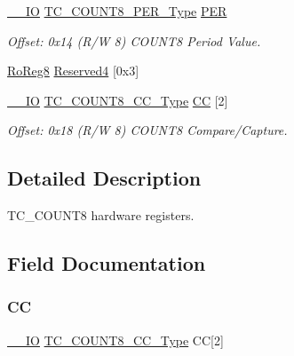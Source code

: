 \begin{DoxyCompactItemize}
\item 
\mbox{\hyperlink{core__cm0plus_8h_aec43007d9998a0a0e01faede4133d6be}{\+\_\+\+\_\+\+IO}} \mbox{\hyperlink{union_t_c___c_o_u_n_t8___p_e_r___type}{T\+C\+\_\+\+C\+O\+U\+N\+T8\+\_\+\+P\+E\+R\+\_\+\+Type}} \mbox{\hyperlink{struct_tc_count8_ae94ea0925cc8635e20b7da2f6b7da943}{P\+ER}}
\begin{DoxyCompactList}\small\item\em Offset\+: 0x14 (R/W 8) C\+O\+U\+N\+T8 Period Value. \end{DoxyCompactList}\item 
\mbox{\hyperlink{group___s_a_m_d21_e15_a__definitions_ga0d957f1433aaf5d70e4dc2b68288442d}{Ro\+Reg8}} \mbox{\hyperlink{struct_tc_count8_abf127d09ee1c1a9cf2b0d88d946dbe0a}{Reserved4}} \mbox{[}0x3\mbox{]}
\item 
\mbox{\hyperlink{core__cm0plus_8h_aec43007d9998a0a0e01faede4133d6be}{\+\_\+\+\_\+\+IO}} \mbox{\hyperlink{union_t_c___c_o_u_n_t8___c_c___type}{T\+C\+\_\+\+C\+O\+U\+N\+T8\+\_\+\+C\+C\+\_\+\+Type}} \mbox{\hyperlink{struct_tc_count8_a9232398c1ba4b8cbe34a76b1c2a5376b}{CC}} \mbox{[}2\mbox{]}
\begin{DoxyCompactList}\small\item\em Offset\+: 0x18 (R/W 8) C\+O\+U\+N\+T8 Compare/\+Capture. \end{DoxyCompactList}\end{DoxyCompactItemize}


\subsection{Detailed Description}
T\+C\+\_\+\+C\+O\+U\+N\+T8 hardware registers. 

\subsection{Field Documentation}
\mbox{\label{struct_tc_count8_a9232398c1ba4b8cbe34a76b1c2a5376b}} 
\subsubsection{\texorpdfstring{CC}{CC}}
{\footnotesize\ttfamily \mbox{\hyperlink{core__cm0plus_8h_aec43007d9998a0a0e01faede4133d6be}{\+\_\+\+\_\+\+IO}} \mbox{\hyperlink{union_t_c___c_o_u_n_t8___c_c___type}{T\+C\+\_\+\+C\+O\+U\+N\+T8\+\_\+\+C\+C\+\_\+\+Type}} CC\mbox{[}2\mbox{]}}



